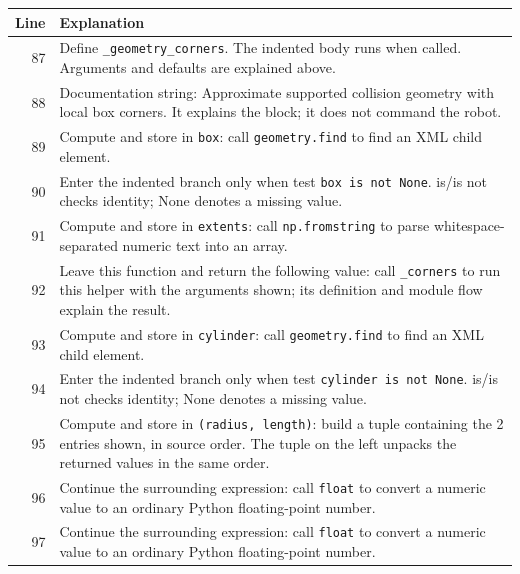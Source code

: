 \documentclass[11pt,a4paper]{book}
\begin{document}
\begin{longtable}{r p{}}

\textbf{Line} & \textbf{Explanation} \\ \hline \endhead

87 & Define \texttt{\_geometry\_corners}. The indented body runs when called. Arguments and defaults are explained above. \\

88 & Documentation string: Approximate supported collision geometry with local box corners. It explains the block; it does not command the robot. \\

89 & Compute and store in \texttt{box}: call \texttt{geometry.find} to find an XML child element.  \\

90 & Enter the indented branch only when test \texttt{box is not None}. is/is not checks identity; None denotes a missing value. \\

91 & Compute and store in \texttt{extents}: call \texttt{np.fromstring} to parse whitespace-separated numeric text into an array.  \\

92 & Leave this function and return the following value: call \texttt{\_corners} to run this helper with the arguments shown; its definition and module flow explain the result. \\

93 & Compute and store in \texttt{cylinder}: call \texttt{geometry.find} to find an XML child element.  \\

94 & Enter the indented branch only when test \texttt{cylinder is not None}. is/is not checks identity; None denotes a missing value. \\

95 & Compute and store in \texttt{(radius, length)}: build a tuple containing the 2 entries shown, in source order. The tuple on the left unpacks the returned values in the same order. \\

96 & Continue the surrounding expression: call \texttt{float} to convert a numeric value to an ordinary Python floating-point number. \\

97 & Continue the surrounding expression: call \texttt{float} to convert a numeric value to an ordinary Python floating-point number. \\


\end{longtable}
\end{document}
